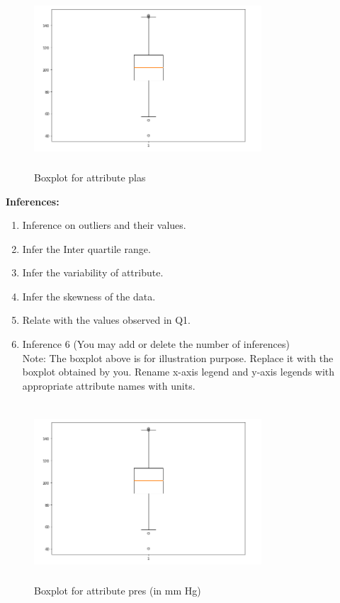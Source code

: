 \documentclass[12 pt, a4paper]{article}
\theoremstyle{definition}
\begin{document}
\begin{figure}[H]
	\centering
	\includegraphics[width=8.5cm,height=6.65cm]{boxplot.png}
	\caption{Boxplot for attribute plas}
	\label{Blockdia}
\end{figure}

\textbf{\Large Inferences:}
\begin{enumerate}
   \item Inference on outliers and their values.
   \item Infer the Inter quartile range.
   \item Infer the variability of attribute.
   \item Infer the skewness of the data.
 \item Relate with the values observed in Q1. \item Inference 6 (You may add or delete the number of inferences)
\\Note: The boxplot above is for illustration purpose. Replace it with the boxplot obtained by you. Rename x-axis legend and y-axis legends with appropriate attribute names with units.

\end{enumerate}

\begin{figure}[H]
	\centering
	\includegraphics[width=8.5cm,height=6.65cm]{boxplot.png}
	\caption{Boxplot for attribute pres (in mm Hg)}
	\label{Blockdia}
\end{figure}
\end{document}
